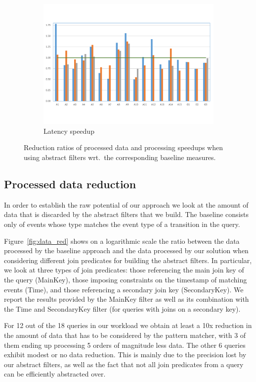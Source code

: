 \begin{figure}[t!]
\begin{subfigure}{\columnwidth}
\includegraphics[clip, trim=0.3cm 2cm 0.4cm 1.8cm,
width=\columnwidth]{graphs/latency_red.pdf}
\caption{Latency speedup}
\label{fig:latency_red}
\end{subfigure}

\caption{Reduction ratios of processed data and processing speedups when using
abstract filters wrt.\ the corresponding baseline measures.}
\end{figure}


\subsection{Processed data reduction}

In order to establish the raw potential of our approach we look at the amount of
data that is discarded by the abstract filters that we build.
The baseline consists only of events whose type matches the event
type of a transition in the query.

Figure~\ref{fig:data_red} shows on a logarithmic scale the ratio between the
data processed by the baseline approach and the data processed by our solution
when considering different join predicates for building the abstract filters.
In particular, we look at three types of join predicates: those referencing
the main join key of the query (MainKey), those imposing constraints on the
timestamp of matching events (Time), and those referencing a secondary join key
(SecondaryKey).
We report the results provided by the MainKey filter as well as its combination
with the Time and SecondaryKey filter (for queries with joins on a secondary
key).
 
For 12 out of the 18 queries in our workload we obtain at least a 10x reduction
in the amount of data that has to be considered by the pattern matcher, with 3
of them ending up processing 5 orders of magnitude less data.
The other 6 queries exhibit modest or no data reduction. This is mainly due to
the precision lost by our abstract filters, as well as the fact that not all
join predicates from a query can be efficiently abstracted over. 

